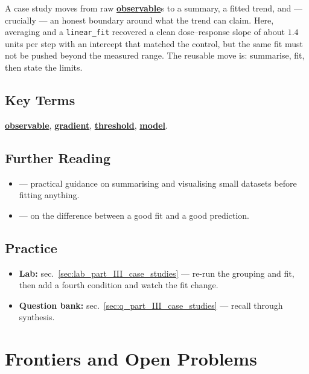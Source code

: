 \documentclass[
]{article}
\providecommand{\tightlist}{%
  \setlength{\itemsep}{0pt}\setlength{\parskip}{0pt}}
\theoremstyle{plain}
\theoremstyle{definition}
\begin{document}
A case study moves from raw
\hyperref[gl:observable]{\textbf{observable}}s to a summary, a fitted
trend, and --- crucially --- an honest boundary around what the trend
can claim. Here, averaging and a \texttt{linear\_fit} recovered a clean
dose--response slope of about \(1.4\) units per step with an intercept
that matched the control, but the same fit must not be pushed beyond the
measured range. The reusable move is: summarise, fit, then state the
limits.

\subsection{Key Terms}\label{key-terms-10}

\hyperref[gl:observable]{\textbf{observable}},
\hyperref[gl:gradient]{\textbf{gradient}},
\hyperref[gl:threshold]{\textbf{threshold}},
\hyperref[gl:model]{\textbf{model}}.

\subsection{Further Reading}\label{further-reading-10}

\begin{itemize}
\tightlist
\item
  \citet{kim2020data} --- practical guidance on summarising and
  visualising small datasets before fitting anything.
\item
  \citet{wilson2021analysis} --- on the difference between a good fit
  and a good prediction.
\end{itemize}

\subsection{Practice}\label{practice-10}

\begin{itemize}
\tightlist
\item
  \textbf{Lab:} sec.~\ref{sec:lab_part_III_case_studies} --- re-run the
  grouping and fit, then add a fourth condition and watch the fit
  change.
\item
  \textbf{Question bank:} sec.~\ref{sec:q_part_III_case_studies} ---
  recall through synthesis.
\end{itemize}

\newpage

\section{Frontiers and Open Problems}\label{sec:part_III_frontiers}
\end{document}
